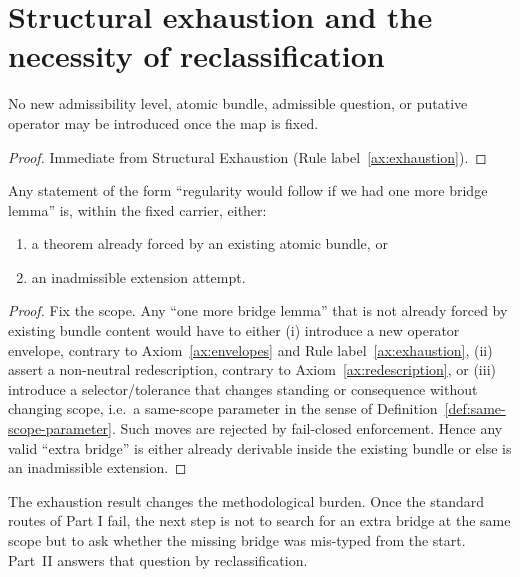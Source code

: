 \section{Structural exhaustion and the necessity of reclassification}
\begin{theorem}\label{thm:exhaustion-restate}
No new admissibility level, atomic bundle, admissible question, or putative operator may be
introduced once the map is fixed. 
\end{theorem}

\begin{proof}
Immediate from Structural Exhaustion (Rule label~\ref{ax:exhaustion}).
\end{proof}

\begin{corollary}\label{cor:no-new-lemma}
Any statement of the form ``regularity would follow if we had one more bridge lemma'' is,
within the fixed carrier, either:
\begin{enumerate}[label=(\alph*), leftmargin=2.2em]
\item a theorem already forced by an existing atomic bundle, or
\item an inadmissible extension attempt.
\end{enumerate}
\end{corollary}

\begin{proof}
Fix the scope. Any ``one more bridge lemma'' that is not already forced by existing bundle content would have to
either (i) introduce a new operator envelope, contrary to Axiom~\ref{ax:envelopes} and Rule label~\ref{ax:exhaustion},
(ii) assert a non-neutral redescription, contrary to Axiom~\ref{ax:redescription}, or
(iii) introduce a selector/tolerance that changes standing or consequence without changing scope, i.e.\ a same-scope
parameter in the sense of Definition~\ref{def:same-scope-parameter}. Such moves are rejected by fail-closed enforcement.
Hence any valid ``extra bridge'' is either already derivable inside the existing bundle or else is an inadmissible extension.
\end{proof}

\begin{remark}
The exhaustion result changes the methodological burden. Once the standard routes of Part I fail,
the next step is not to search for an extra bridge at the same scope but to ask whether the missing bridge was mis-typed from the start. Part~II answers that question by reclassification.
\end{remark}

